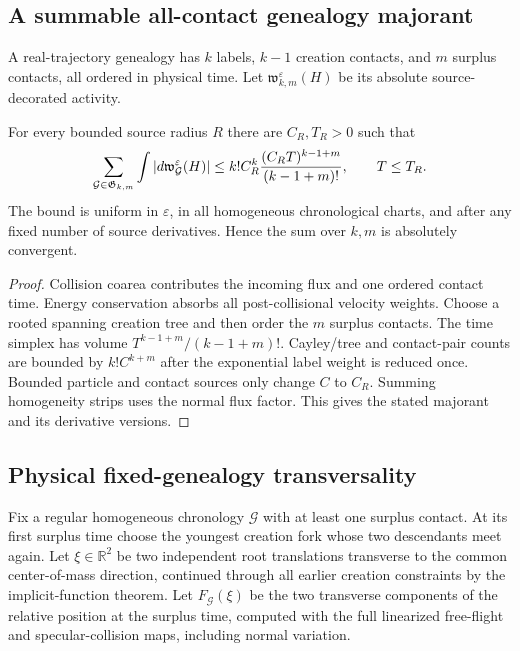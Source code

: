 \subsection{A summable all-contact genealogy majorant}

A real-trajectory genealogy has $k$ labels, $k-1$ creation contacts, and $m$
surplus contacts, all ordered in physical time.  Let
$\mathfrak w_{k,m}^\varepsilon(H)$ be its absolute source-decorated activity.

\begin{lemma}
\label{lem:r13-b2-majorant}
For every bounded source radius $R$ there are $C_R,T_R>0$ such that
\[
 \sum_{\mathcal G\in\mathfrak G_{k,m}}
 \int|d\mathfrak w_{\mathcal G}^\varepsilon(H)|
 \le
 k!C_R^k{(C_RT)^{k-1+m}\over(k-1+m)!},
 \qquad T\le T_R.
\]
The bound is uniform in $\varepsilon$, in all homogeneous chronological
charts, and after any fixed number of source derivatives.  Hence the sum over
$k,m$ is absolutely convergent.
\end{lemma}

\begin{proof}
Collision coarea contributes the incoming flux and one ordered contact time.
Energy conservation absorbs all post-collisional velocity weights.  Choose a
rooted spanning creation tree and then order the $m$ surplus contacts.  The
time simplex has volume $T^{k-1+m}/(k-1+m)!$.  Cayley/tree and contact-pair
counts are bounded by $k!C^{k+m}$ after the exponential label weight is
reduced once.  Bounded particle and contact sources only change $C$ to $C_R$.
Summing homogeneity strips uses the normal flux factor.  This gives the
stated majorant and its derivative versions.
\end{proof}

\subsection{Physical fixed-genealogy transversality}

Fix a regular homogeneous chronology $\mathcal G$ with at least one surplus
contact.  At its first surplus time choose the youngest creation fork whose
two descendants meet again.  Let $\xi\in\mathbb R^2$ be two independent root
translations transverse to the common center-of-mass direction, continued
through all earlier creation constraints by the implicit-function theorem.
Let $F_{\mathcal G}(\xi)$ be the two transverse components of the relative
position at the surplus time, computed with the full linearized free-flight
and specular-collision maps, including normal variation.


